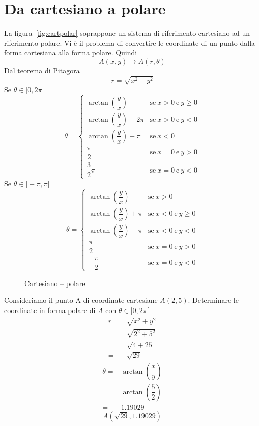 \section{Da cartesiano a polare}
La figura~\vref{fig:cartpolar} soprappone un sistema di riferimento cartesiano ad un riferimento polare. Vi è il problema di convertire le coordinate di un punto dalla forma cartesiana alla forma polare. Quindi 
\[A(x,y)\mapsto A(r,\theta) \]
Dal teorema di Pitagora \[r=\sqrt{x^2+y^2} \]
Se $\theta\in[0,2\pi[$
\[\theta=\begin{cases}
\arctan(\dfrac{y}{x})&\text{se}\ x>0 \ \text{e} \ y\geq0\\[8pt]
\arctan(\dfrac{y}{x})+2\pi&\text{se}\ x>0 \ \text{e} \ y<0\\[8pt]
\arctan(\dfrac{y}{x})+\pi&\text{se}\ x<0\\[8pt]
\dfrac{\pi}{2}&\text{se}\ x=0 \ \text{e} \ y>0\\[8pt]
\dfrac{3}{2}\pi&\text{se}\ x=0 \ \text{e} \ y<0
\end{cases} 
\] 
Se $\theta\in]-\pi,\pi]$
\[\theta=\begin{cases}
\arctan(\dfrac{y}{x})&\text{se}\ x>0 \\[8pt]
\arctan(\dfrac{y}{x})+\pi&\text{se}\ x<0 \ \text{e} \ y\geq0\\[8pt]
\arctan(\dfrac{y}{x})-\pi&\text{se}\ x<0\ \text{e} \ y<0\\[8pt]
\dfrac{\pi}{2}&\text{se}\ x=0 \ \text{e} \ y>0\\[8pt]
-\dfrac{\pi}{2}&\text{se}\ x=0 \ \text{e} \ y<0
\end{cases} 
\]
\begin{figure} %
	\centering
	
	\caption{Cartesiano -- polare}\label{fig:cartpolar}
\end{figure}
\begin{esempiot}{}{} Consideriamo il punto A di coordinate cartesiane $A(2,5)$. Determinare le coordinate in forma polare di $A$ con $\theta\in[0,2\pi[$
	\begin{align*}
	r=&\sqrt{x^2+y^2}\\
	=&\sqrt{2^2+5^2}\\
	=&\sqrt{4+25}\\
	=&\sqrt{29}
	\end{align*}
	\begin{align*}
	\theta=&\arctan\left(\dfrac{x}{y}\right)\\
		 =&\arctan\left(\dfrac{5}{2}\right)\\
	=&1.19029
	\end{align*}
	\[A(\sqrt{29},1.19029) \]
\end{esempiot}
